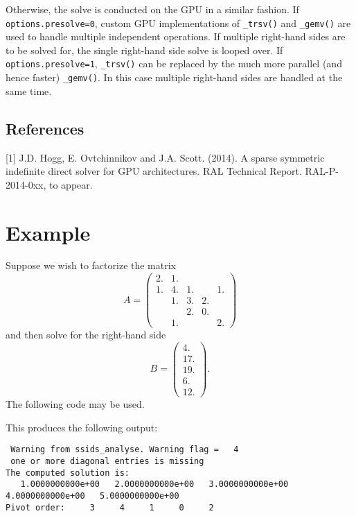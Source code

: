 Otherwise, the solve is conducted on the GPU in a similar fashion. If
\texttt{options.presolve=0}, custom GPU implementations of \texttt{\_trsv()}
and \texttt{\_gemv()} are used to handle multiple independent operations. If
multiple right-hand sides are to be solved for, the single right-hand side solve is looped over. If \texttt{options.presolve=1}, \texttt{\_trsv()} can be
replaced by the much more parallel (and hence faster) \texttt{\_gemv()}. In
this case multiple right-hand sides are handled at the same time.

\subsection*{References}
[1] J.D. Hogg, E. Ovtchinnikov and J.A. Scott. (2014).
A sparse symmetric indefinite direct solver for GPU architectures.
RAL Technical Report. RAL-P-2014-0xx, to appear.




\section{Example} \label{ssids: examples}

Suppose we wish to factorize the matrix
\[ A = \left(
\begin{array}{ccccc}
2. & 1. \\
1. & 4. & 1. & & 1. \\
 & 1. & 3. & 2. \\
& & 2. & 0. &  \\
& 1. & & & 2.
\end{array}
\right)
\]
and then solve for the right-hand side
\[ B = \left(
\begin{array}{c}
4. \\
17. \\
19. \\
6. \\
12.
\end{array}
\right).
\]
The following code may be used.

This produces the following output:
\begin{verbatim}
 Warning from ssids_analyse. Warning flag =   4
 one or more diagonal entries is missing
The computed solution is:
   1.0000000000e+00   2.0000000000e+00   3.0000000000e+00   4.0000000000e+00   5.0000000000e+00
Pivot order:     3     4     1     0     2
\end{verbatim}

\begin{funders}
\end{funders}
